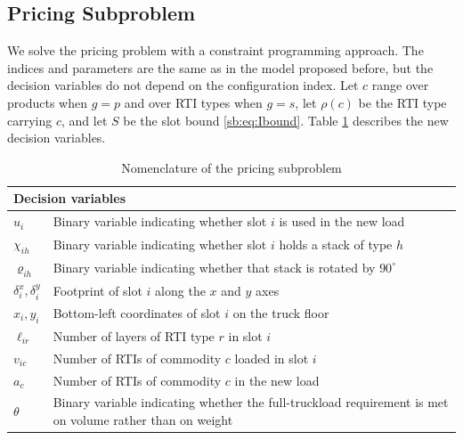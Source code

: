 \subsection{Pricing Subproblem}
\label{sec:pp}

We solve the pricing problem with a constraint programming approach.
The indices and parameters are the same as in the model proposed
before, but the decision variables do not depend on the configuration
index. Let $c$ range over products when $g=p$ and over RTI types when
$g=s$, let $\rho(c)$ be the RTI type carrying $c$, and let $S$ be the
slot bound \eqref{sb:eq:Ibound}. Table
\ref{tab:NomenclaturePricing3D} describes the new decision variables.

\begin{longtable}[hbt!]{|p{}|p{}|}
\caption{Nomenclature of the pricing subproblem}
\label{tab:NomenclaturePricing3D}\\
\hline
\multicolumn{2}{|l|}{\textbf{Decision variables}}\\ \hline
$u_{i}$        & Binary variable indicating whether slot $i$ is used in the new load\\
$\chi_{ih}$    & Binary variable indicating whether slot $i$ holds a stack of type $h$\\
$\varrho_{ih}$ & Binary variable indicating whether that stack is rotated by $90^{\circ}$\\
$\delta^{x}_{i},\delta^{y}_{i}$ & Footprint of slot $i$ along the $x$ and $y$ axes\\
$x_{i},y_{i}$  & Bottom-left coordinates of slot $i$ on the truck floor\\
$\ell_{ir}$    & Number of layers of RTI type $r$ in slot $i$\\
$v_{ic}$       & Number of RTIs of commodity $c$ loaded in slot $i$\\
$a_{c}$        & Number of RTIs of commodity $c$ in the new load\\
$\theta$       & Binary variable indicating whether the full-truckload requirement is met on volume rather than on weight\\
\hline
\end{longtable}

